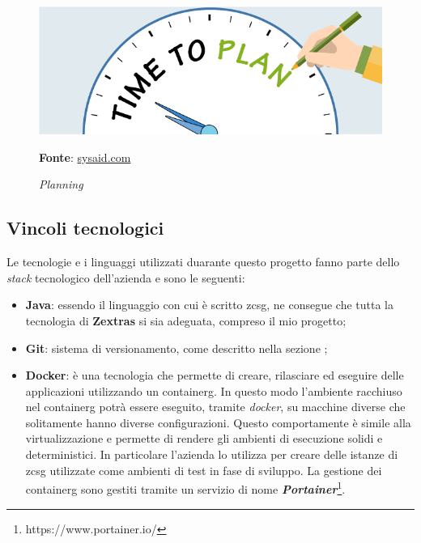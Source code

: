     \begin{figure}[h]
        \centering
        \includegraphics[width=1\textwidth]{immagini/plan.png}
        \caption{\textit{Planning}}
        \textbf{Fonte}:
        \href{https://www.sysaid.com/blog/entry/8-tips-on-how-to-plan-for-configuration-management-part-1}{sysaid.com}
        \label{fig: Planning}
    \end{figure}
    
    \subsection{Vincoli tecnologici}
    Le tecnologie e i linguaggi utilizzati duarante questo progetto fanno parte dello \textit{stack} tecnologico dell'azienda e sono le seguenti:
    \begin{itemize}
        \item \textbf{Java}: essendo il linguaggio con cui è scritto \gls{zcsg}, ne consegue che tutta la tecnologia di \textbf{Zextras} si sia adeguata, compreso il mio progetto;
        \item \textbf{Git}: sistema di versionamento, come descritto nella sezione ;
        \item \textbf{Docker}: è una tecnologia che permette di creare, rilasciare ed eseguire delle applicazioni utilizzando un \gls{containerg}. In questo modo l'ambiente racchiuso nel \gls{containerg} potrà essere eseguito, tramite \textit{docker}, su macchine diverse che solitamente hanno diverse configurazioni. Questo comportamente è simile alla virtualizzazione e permette di rendere gli ambienti di esecuzione solidi e deterministici. In particolare l'azienda lo utilizza per creare delle istanze di \gls{zcsg} utilizzate come ambienti di test in fase di sviluppo. La gestione dei \gls{containerg} sono gestiti tramite un servizio di nome \textbf{\textit{Portainer}}\footnote{https://www.portainer.io/}.
    \end{itemize}

